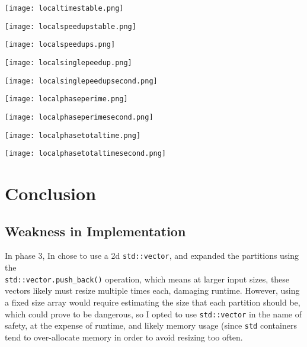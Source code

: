 \documentclass[11pt]{report}
\newcommand{\SCALE}{0.5}
\begin{document}
\begin{minipage}{\SCALE\linewidth}
\texttt{[image: localtimestable.png]}
\end{minipage}
\hfill
\begin{minipage}{\SCALE\linewidth}
\texttt{[image: localspeedupstable.png]}
\end{minipage}

\begin{minipage}{\SCALE\linewidth}
\texttt{[image: localspeedups.png]}
\end{minipage}
\hfill
\begin{minipage}{\SCALE\linewidth}
\texttt{[image: localsinglepeedup.png]}
\end{minipage}

\begin{minipage}{\SCALE\linewidth}
\texttt{[image: localsinglepeedupsecond.png]}
\end{minipage}

\begin{minipage}{\SCALE\linewidth}
\texttt{[image: localphaseperime.png]}
\end{minipage}
\hfill
\begin{minipage}{\SCALE\linewidth}
\texttt{[image: localphaseperimesecond.png]}
\end{minipage}

\begin{minipage}{\SCALE\linewidth}
\texttt{[image: localphasetotaltime.png]}
\end{minipage}
\hfill
\begin{minipage}{\SCALE\linewidth}
\texttt{[image: localphasetotaltimesecond.png]}
\end{minipage}

\section*{Conclusion}

\subsection*{Weakness in Implementation}
In phase 3, In chose to use a 2d \verb|std::vector|, and expanded the partitions using the \\ \verb|std::vector.push_back()| operation, which means at larger input sizes, these vectors likely must resize multiple times each, damaging runtime. However, using a fixed size array would require estimating the size that each partition should be, which could prove to be dangerous, so I opted to use \verb|std::vector| in the name of safety, at the expense of runtime, and likely memory usage (since \verb|std| containers tend to over-allocate memory in order to avoid resizing too often.
\end{document}
